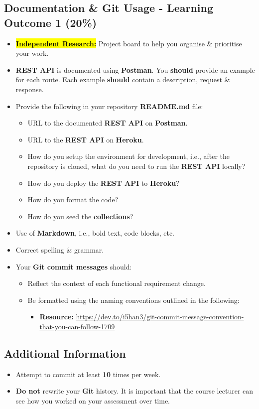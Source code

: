 \documentclass{article}
\begin{document}
\subsection*{Documentation \& Git Usage - Learning Outcome 1 (20\%)}
\begin{itemize}
	\item \hl{\textbf{Independent Research:}} Project board to help you organise \& prioritise your work. 
	\item \textbf{REST API} is documented using \textbf{Postman}. You \textbf{should} provide an example for each route. Each example \textbf{should} contain a description, request \& response.
	\item Provide the following in your repository \textbf{README.md} file:
	\begin{itemize}
		\item URL to the documented \textbf{REST API} on \textbf{Postman}.
		\item URL to the \textbf{REST API} on \textbf{Heroku}.
		\item How do you setup the environment for development, i.e., after the repository is cloned, what do you need to run the \textbf{REST API} locally?
		\item How do you deploy the \textbf{REST API} to \textbf{Heroku}?
		\item How do you format the code?
		\item How do you seed the \textbf{collections}?
	\end{itemize}
	\item Use of \textbf{Markdown}, i.e., bold text, code blocks, etc.
	\item Correct spelling \& grammar. 
	\item Your \textbf{Git commit messages} should:
	\begin{itemize}
		\item Reflect the context of each functional requirement change.
		\item Be formatted using the naming conventions outlined in the following:
			\begin{itemize}
				\item \textbf{Resource:} \small\href{https://dev.to/i5han3/git-commit-message-convention-that-you-can-follow-1709}{https://dev.to/i5han3/git-commit-message-convention-that-you-can-follow-1709}
			\end{itemize}
	\end{itemize}
\end{itemize}

\subsection*{Additional Information}
\begin{itemize}
    \item Attempt to commit at least \textbf{10} times per week.
    \item \textbf{Do not} rewrite your \textbf{Git} history. It is important that the course lecturer can see how you worked on your assessment over time. 
\end{itemize} 
\end{document}
